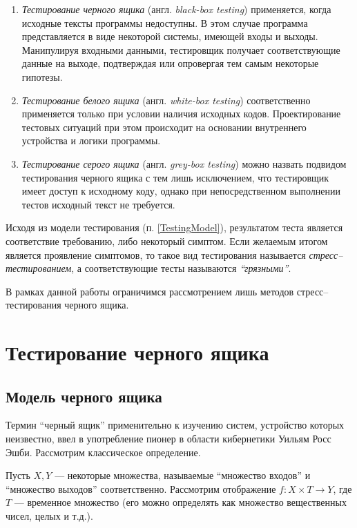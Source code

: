 \documentclass[a4paper,14pt,href]{article}
\begin{document}
\begin{enumerate}
\item 
\textit{Тестирование черного ящика} (англ. \textit{black-box testing}) применяется, когда исходные тексты программы недоступны. В этом случае программа представляется в виде некоторой системы, имеющей входы и выходы. Манипулируя входными данными, тестировщик получает соответствующие данные на выходе, подтверждая или опровергая тем самым некоторые гипотезы.
\item
\textit{Тестирование белого ящика} (англ. \textit{white-box testing}) соответственно применяется только при условии наличия исходных кодов. Проектирование тестовых ситуаций при этом происходит на основании внутреннего устройства и логики программы\cite{TestingWhiteBox}.
\item
\textit{Тестирование серого ящика} (англ. \textit{grey-box testing}) можно назвать подвидом тестирования черного ящика с тем лишь исключением, что тестировщик имеет доступ к исходному коду, однако при непосредственном выполнении тестов исходный текст не требуется.
\end{enumerate}  

	Исходя из модели тестирования (п. \ref{TestingModel}), результатом теста является соответствие требованию, либо некоторый симптом. Если желаемым итогом является проявление симптомов, то такое вид тестирования называется \textit{стресс--тестированием}, а соответствующие тесты называются \textit{``грязными''}.

	В рамках данной работы ограничимся рассмотрением лишь методов стресс--тестирования черного ящика.

\section{Тестирование черного ящика}
\subsection{Модель черного ящика}
Термин ``черный ящик'' применительно к изучению систем, устройство которых неизвестно, ввел в употребление пионер в области кибернетики Уильям Росс Эшби\cite{Ashby}. Рассмотрим классическое определение.

Пусть $X, Y$  --- некоторые множества, называемые ``множество входов'' и ``множество выходов'' соответственно.
Рассмотрим отображение $f : X \times T \to Y $, где $T$ --- временное множество (его можно определять как множество вещественных чисел, целых и т.д.).
\end{document}
